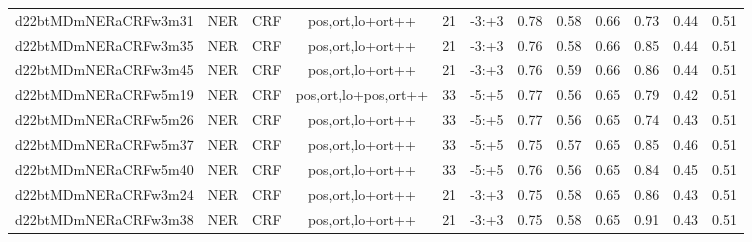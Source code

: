 \documentclass[a4paper]{article}
\begin{document}
\begin{landscape}
\begin{center}
\begin{tabular}{ |c|c|c|c|c|c|c|c|c|c|c|c|}
 	
 
 	
 		
 		\small{ d22btMDmNERaCRFw3m31 } & NER & CRF & pos,ort,lo+ort++  &  21 &  -3:+3  &  0.78 & 0.58 & 0.66  &  0.73 & 0.44 & 0.51 \\
 		

 	
 
 	
 		
 		\small{ d22btMDmNERaCRFw3m35 } & NER & CRF & pos,ort,lo+ort++  &  21 &  -3:+3  &  0.76 & 0.58 & 0.66  &  0.85 & 0.44 & 0.51 \\
 		

 	
 
 	
 		
 		\small{ d22btMDmNERaCRFw3m45 } & NER & CRF & pos,ort,lo+ort++  &  21 &  -3:+3  &  0.76 & 0.59 & 0.66  &  0.86 & 0.44 & 0.51 \\
 		

 	
 
 	
 		
 		\small{ d22btMDmNERaCRFw5m19 } & NER & CRF & pos,ort,lo+pos,ort++  &  33 &  -5:+5  &  0.77 & 0.56 & 0.65  &  0.79 & 0.42 & 0.51 \\
 		

 	
 
 	
 		
 		\small{ d22btMDmNERaCRFw5m26 } & NER & CRF & pos,ort,lo+ort++  &  33 &  -5:+5  &  0.77 & 0.56 & 0.65  &  0.74 & 0.43 & 0.51 \\
 		

 	
 
 	
 		
 		\small{ d22btMDmNERaCRFw5m37 } & NER & CRF & pos,ort,lo+ort++  &  33 &  -5:+5  &  0.75 & 0.57 & 0.65  &  0.85 & 0.46 & 0.51 \\
 		

 	
 
 	
 		
 		\small{ d22btMDmNERaCRFw5m40 } & NER & CRF & pos,ort,lo+ort++  &  33 &  -5:+5  &  0.76 & 0.56 & 0.65  &  0.84 & 0.45 & 0.51 \\
 		

 	
 
 	
 		
 		\small{ d22btMDmNERaCRFw3m24 } & NER & CRF & pos,ort,lo+ort++  &  21 &  -3:+3  &  0.75 & 0.58 & 0.65  &  0.86 & 0.43 & 0.51 \\
 		

 	
 
 	
 		
 		\small{ d22btMDmNERaCRFw3m38 } & NER & CRF & pos,ort,lo+ort++  &  21 &  -3:+3  &  0.75 & 0.58 & 0.65  &  0.91 & 0.43 & 0.51 \\
 		


\end{tabular}
\end{center}
\end{landscape}
\end{document}
